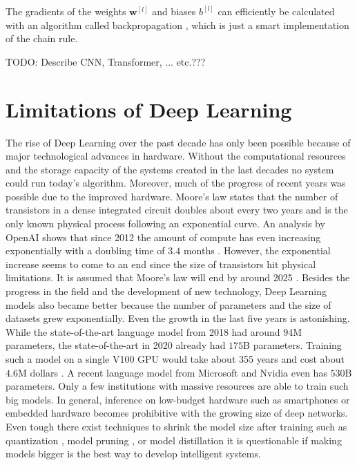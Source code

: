 The gradients of the weights \(\boldsymbol{w}^{[l]}\) and biases \(b^{[l]}\) can efficiently be calculated with an algorithm called backpropagation , which is just a smart implementation of the chain rule.

TODO: Describe CNN, Transformer, ... etc.???

\section{Limitations of Deep Learning}
The rise of Deep Learning over the past decade has only been possible because of major technological advances in hardware.
Without the computational resources and the storage capacity of the systems created in the last decades no system could run today's algorithm.
Moreover, much of the progress of recent years was possible due to the improved hardware. 
Moore’s law \cite{Moore_2006} states that the number of transistors in a dense integrated circuit doubles about every two years and is the only known physical process following an exponential curve.
An analysis by OpenAI shows that since 2012 the amount of compute has even increasing exponentially with a doubling time  of \(3.4\) months \cite{OpenAI_compute}.
However, the exponential increase seems to come to an end since the size of transistors hit physical limitations.
It is assumed that Moore's law will end by around 2025 .
Besides the progress in the field and the development of new technology, Deep Learning models also became better because the number of parameters and the size of datasets grew exponentially.
Even the growth in the last five years is astonishing.
While the state-of-the-art language model from 2018  had around \(94\)M parameters, the state-of-the-art in 2020  already had \(175\)B parameters. Training such a model on a single V100 GPU would take about 355 years and cost about \(4.6\)M dollars \cite{Lambda_GPT3}.
A recent language model from Microsoft and Nvidia  even has \(530\)B parameters.
Only a few institutions with massive resources are able to train such big models.
In general, inference on low-budget hardware such as smartphones or embedded hardware becomes prohibitive with the growing size of deep networks.
Even tough there exist techniques to shrink the model size after training such as quantization \cite{Wu_Judd_Zhang_Isaev_Micikevicius_2020}, model pruning \cite{Choudhary_Mishra_Goswami_Sarangapani_2020}, or model distillation \cite{Hinton_Vinyals_Dean_2015} it is questionable if making models bigger is the best way to develop intelligent systems.

